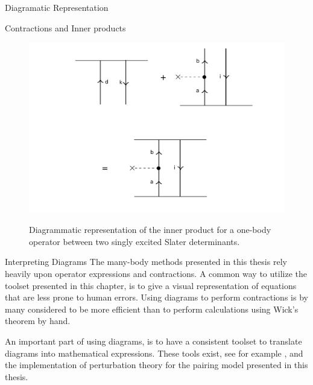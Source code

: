 \documentclass[twoside,english]{uiofysmaster}
\begin{document}
\begin{chapter}{Diagramatic Representation}
\begin{section}{Contractions and Inner products}
\begin{figure}[H]
			\includegraphics[width=\textwidth]{Figures/InnerProduct.pdf}
			\label{InnerProduct}
			\caption{Diagrammatic representation of the inner product for a one-body operator between two singly excited Slater determinants.}
		\end{figure}
	\end{section}
	\begin{section}{Interpreting Diagrams}	
		The many-body methods presented in this thesis rely heavily upon operator expressions and contractions. A common way to utilize the toolset presented in this chapter, is to give a visual representation of equations that are less prone to human errors. Using diagrams to perform contractions is by many considered to be more efficient than to perform calculations using Wick's theorem by hand. 

		An important part of using diagrams, is to have a consistent toolset to translate diagrams into mathematical expressions. These tools exist, see for example \cite{ShavittAndBartlett}, and the implementation of perturbation theory for the pairing model presented in this thesis. 
	\end{section}

\end{chapter}
\end{document}
